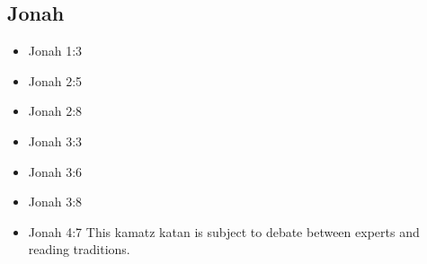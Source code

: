 \documentclass[14pt]{book}
\begin{document}
															\subsection{Jonah}
														\begin{multicols}{2}\begin{itemize}
																
																\item Jonah 1:3
																
																\item Jonah 2:5
																
																\item Jonah 2:8
																
																\item Jonah 3:3
																
																\item Jonah 3:6
																
																\item Jonah 3:8
																
																\item Jonah 4:7 This kamatz katan is subject to debate between experts and reading traditions.
																
																								\end{itemize}\end{multicols}
\end{document}
